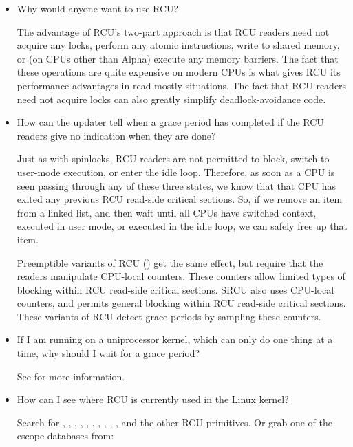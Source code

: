 \begin{itemize}
\item Why would anyone want to use RCU\@?

  The advantage of RCU's two-part approach is that RCU readers need
  not acquire any locks, perform any atomic instructions, write to
  shared memory, or (on CPUs other than Alpha) execute any memory
  barriers.
  The fact that these operations are quite expensive
  on modern CPUs is what gives RCU its performance advantages
  in read-mostly situations.
  The fact that RCU readers need not
  acquire locks can also greatly simplify deadlock-avoidance code.

\item How can the updater tell when a grace period has completed
  if the RCU readers give no indication when they are done?

  Just as with spinlocks, RCU readers are not permitted to
  block, switch to user-mode execution, or enter the idle loop.
  Therefore, as soon as a CPU is seen passing through any of these
  three states, we know that that CPU has exited any previous RCU
  read-side critical sections.
  So, if we remove an item from a
  linked list, and then wait until all CPUs have switched context,
  executed in user mode, or executed in the idle loop, we can
  safely free up that item.

  Preemptible variants of RCU () get the
  same effect, but require that the readers manipulate CPU-local
  counters.
  These counters allow limited types of blocking within
  RCU read-side critical sections.
  SRCU also uses CPU-local
  counters, and permits general blocking within RCU read-side
  critical sections.
  These variants of RCU detect grace periods
  by sampling these counters.

\item If I am running on a uniprocessor kernel, which can only do one
  thing at a time, why should I wait for a grace period?

  See  for more information.

\item How can I see where RCU is currently used in the Linux kernel?

  Search for , , ,
  , , ,
  , , ,
  , and the other RCU primitives.
  Or grab one
  of the cscope databases from:


\end{itemize}
